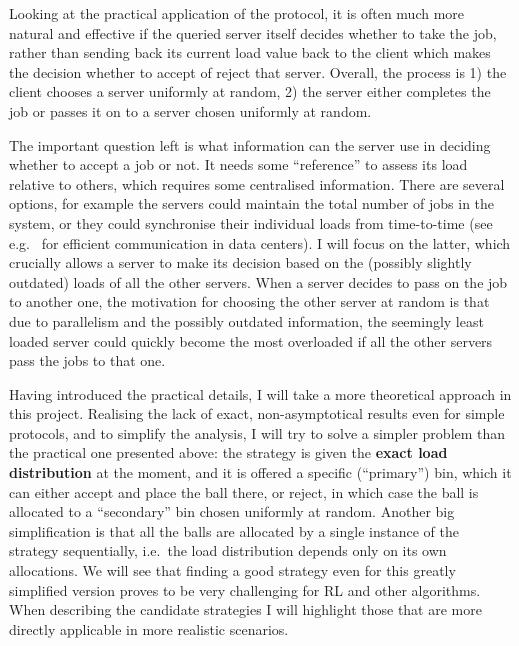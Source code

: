Looking at the practical application of the \TwoThinning protocol, it is often much more natural and effective if the queried server itself decides whether to take the job, rather than sending back its current load value back to the client which makes the decision whether to accept of reject that server.  Overall, the process is 1) the client chooses a server uniformly at random, 2) the server either completes the job or passes it on to a server chosen uniformly at random.

The important question left is what information can the server use in deciding whether to accept a job or not. It needs some ``reference'' to assess its load relative to others, which requires some centralised information. There are several options, for example the servers could maintain the total number of jobs in the system, or they could synchronise their individual loads from time-to-time (see e.g.~\cite{zhang2018datacenterloadbalancing} for efficient communication in data centers). I will focus on the latter, which crucially allows a server to make its decision based on the (possibly slightly outdated) loads of all the other servers. When a server decides to pass on the job to another one, the motivation for choosing the other server at random is that due to parallelism and the possibly outdated information, the seemingly least loaded server could quickly become the most overloaded if all the other servers pass the jobs to that one.


Having introduced the practical details, I will take a more theoretical approach in this project. Realising the lack of exact, non-asymptotical results even for simple protocols, and to simplify the analysis, I will try to solve a simpler problem than the practical one presented above: the strategy is given the \textbf{exact load distribution} at the moment, and it is offered a specific (``primary'') bin, which it can either accept and place the ball there, or reject, in which case the ball is allocated to a ``secondary'' bin chosen uniformly at random. Another big simplification is that all the balls are allocated by a single instance of the strategy sequentially, i.e.\ the load distribution depends only on its own allocations. We will see that finding a good strategy even for this greatly simplified version proves to be very challenging for RL and other algorithms. When describing the candidate strategies I will highlight those that are more directly applicable in more realistic scenarios. 


